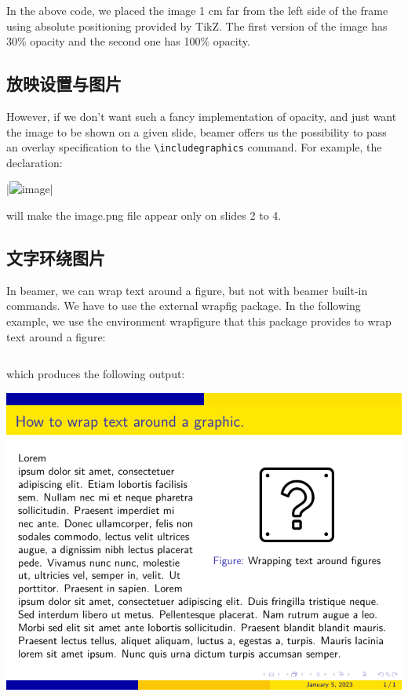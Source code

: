 \begin{column}{0.5\textwidth}
In the above code, we placed the image 1 cm far from the left side of the frame using absolute positioning provided by TikZ. The first version of the image has 30\% opacity and the second one has 100\% opacity.

\subsection{放映设置与图片}

However, if we don’t want such a fancy implementation of opacity, and just want the image to be shown on a given slide, beamer offers us the possibility to pass an overlay specification to the \verb|\includegraphics| command. For example, the declaration:

|\includegraphics<2-4>[width=\textwidth]{image.png}|

will make the image.png file appear only on slides 2 to 4. 

\subsection{文字环绕图片}

In beamer, we can wrap text around a figure, but not with beamer built-in commands. We have to use the external wrapfig package. In the following example, we use the environment wrapfigure that this package provides to wrap text around a figure:

\inputminted[linenos=true]{latex}{examples/beamer/figure-text-wrapping.tex}

which produces the following output:

\includegraphics{examples/beamer/figure-text-wrapping.pdf}


\end{column}
